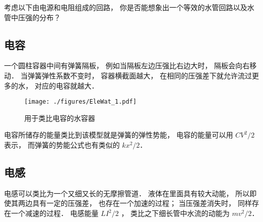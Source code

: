 \begin{exercise}{}
考虑以下由电源和电阻组成的回路， 你是否能想象出一个等效的水管回路以及水管中压强的分布？
\end{exercise}

\subsection{电容}
一个圆柱容器中间有弹簧隔板， 例如当隔板左边压强比右边大时， 隔板会向右移动． 当弹簧弹性系数不变时， 容器横截面越大， 在相同的压强差下就允许流过更多的水， 对应的电容就越大．
\begin{figure}[ht]
\centering
\texttt{[image: ./figures/EleWat\_1.pdf]}
\caption{用于类比电容的水容器} \label{EleWat_fig1}
\end{figure}

电容所储存的能量类比到该模型就是弹簧的弹性势能， 电容的能量可以用 $CV^2/2$ 表示， 而弹簧的势能公式也有类似的 $kx^2/2$．

\subsection{电感}
电感可以类比为一个又细又长的无摩擦管道． 液体在里面具有较大动能， 所以即使其两边具有一定的压强差， 也存在一个加速的过程； 当压强差消失时， 同样存在一个减速的过程． 电感能量 $LI^2/2$ ， 类比之下细长管中水流的动能为 $mv^2/2$．
